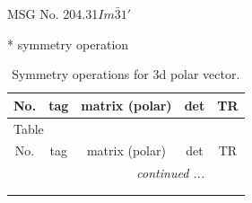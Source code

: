 \documentclass[fleqn,8pt]{jsarticle}
\begin{document}
\setcounter{MaxMatrixCols}{32}

\renewcommand{\tablename}{Table~}
\renewcommand{\figurename}{Figure~}
\begin{center}
\LARGE
MSG No. 204.31\quad$Im\bar{3}1'$
\end{center}
* symmetry operation
\renewcommand{\arraystretch}{1.3}
\begin{longtable}{ccccc}
\caption{Symmetry operations for 3d polar vector.}
 \\
 \hline \hline
No. & tag & matrix (polar) & det & TR \\ \hline \endfirsthead

\multicolumn{4}{l}{\tablename\ \thetable{}} \\
 \hline \hline
No. & tag & matrix (polar) & det & TR \\ \hline \endhead

 \hline \hline
\multicolumn{4}{r}{\footnotesize\it continued ...} \\ \endfoot

 \hline \hline
\multicolumn{4}{r}{} \\ \endlastfoot


\end{longtable}
\end{document}
